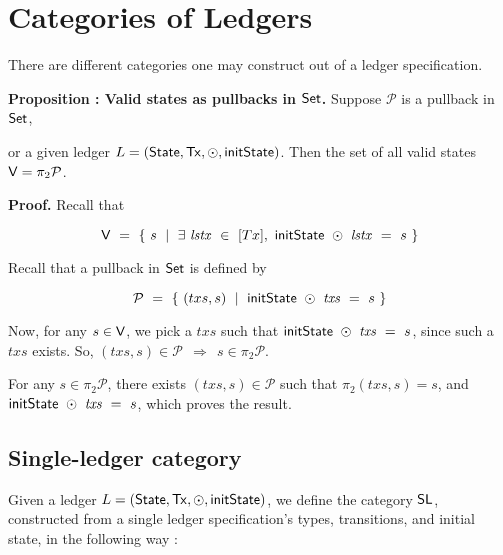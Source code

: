 \section{Categories of Ledgers}
\label{sec:cats}

There are different categories one may construct out of a ledger specification.

\textbf{Proposition : Valid states as pullbacks in $\mathsf{Set}$. } Suppose
$\mathcal{P}$ is a pullback in $\mathsf{Set}$, \newline

\begin{center}
\end{center}

or a given ledger $L = (\mathsf{State}, \mathsf{Tx}, \odot, \mathsf{initState})$. Then the set of all
valid states $\mathsf{V} = \pi_2 \mathcal{P}$.

\textbf{Proof. } Recall that

\[ \mathsf{V}~=~ \{ ~s~ \mid ~\exists~\mathit{lstx}~\in~[Tx],~\mathsf{initState}~\odot~\mathit{lstx}~=~s~\} \]

Recall that a pullback in $\mathsf{Set}$ is defined by

\[ \mathcal{P}~=~ \{ ~(txs, s)~ \mid ~\mathsf{initState}~\odot~\mathit{txs}~=~s~\} \]

Now, for any $s \in \mathsf{V}$, we pick a $txs$ such that $\mathsf{initState}~\odot~\mathit{txs}~=~s$,
since such a $txs$ exists. So, $(txs, s) \in \mathcal{P} ~~\Rightarrow ~~s \in \pi_2 \mathcal{P}$.

For any $s \in \pi_2 \mathcal{P}$, there exists $(txs, s) \in \mathcal{P}$ such that
$\pi_2 (txs, s) = s$, and $\mathsf{initState}~\odot~\mathit{txs}~=~s$, which proves the result.

\subsection{Single-ledger category}
\label{sec:slc}

Given a ledger $L = (\mathsf{State}, \mathsf{Tx}, \odot, \mathsf{initState})$, we define the category $\mathsf{SL}$, constructed
from a single ledger specification's types, transitions, and initial state,
in the following way :


